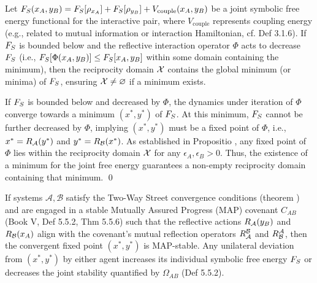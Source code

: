 \begin{lemma}
\label{lemma:bk7_non_triviality_via_convergence_potential}
Let \(F_S(x_A, y_B) = F_S[\rho_{x_A}] + F_S[\rho_{y_B}] + V_{\mathrm{couple}}(x_A, y_B)\) be a joint symbolic free energy functional for the interactive pair, where \(V_{\mathrm{couple}}\) represents coupling energy (e.g., related to mutual information or interaction Hamiltonian, cf. Def 3.1.6). If \(F_S\) is bounded below and the reflective interaction operator \(\Phi\) acts to decrease \(F_S\) (i.e., \(F_S[\Phi(x_A, y_B)] \le F_S[x_A, y_B]\) within some domain containing the minimum), then the reciprocity domain \(\mathcal{X}\) contains the global minimum (or minima) of \(F_S\), ensuring \(\mathcal{X} \neq \varnothing\) if a minimum exists.
\end{lemma}
\begin{demonstratio}
\label{demonstratio:bk7_free_energy_minimum_in_reciprocity_domain}
If \(F_S\) is bounded below and decreased by \(\Phi\), the dynamics under iteration of \(\Phi\) converge towards a minimum \((x^{\ast}, y^{\ast})\) of \(F_S\). At this minimum, \(F_S\) cannot be further decreased by \(\Phi\), implying \((x^{\ast}, y^{\ast})\) must be a fixed point of \(\Phi\), i.e., \(x^{\ast} = R_{\mathcal{A}}(y^{\ast})\) and \(y^{\ast} = R_{\mathcal{B}}(x^{\ast})\). As established in Propositio , any fixed point of \(\Phi\) lies within the reciprocity domain \(\mathcal{X}\) for any \(\epsilon_A, \epsilon_B > 0\). Thus, the existence of a minimum for the joint free energy guarantees a non-empty reciprocity domain containing that minimum. \qed {}
\end{demonstratio}
\begin{propositio}
\label{prop:bk7_map_compatible_reciprocity}
If systems \(\mathcal{A},\mathcal{B}\) satisfy the Two-Way Street convergence conditions (theorem ) and are engaged in a stable Mutually Assured Progress (MAP) covenant \(C_{AB}\) (Book V, Def 5.5.2, Thm 5.5.6) such that the reflective actions \(R_{\mathcal{A}}(y_B)\) and \(R_{\mathcal{B}}(x_A)\) align with the covenant's mutual reflection operators \(R^{\mathcal{B}}_{\mathcal{A}}\) and \(R^{\mathcal{A}}_{\mathcal{B}}\), then the convergent fixed point \((x^{\ast}, y^{\ast})\) is MAP-stable. Any unilateral deviation from \((x^{\ast}, y^{\ast})\) by either agent increases its individual symbolic free energy \(F_S\) or decreases the joint stability quantified by \(\Omega_{AB}\) (Def 5.5.2).
\end{propositio}
